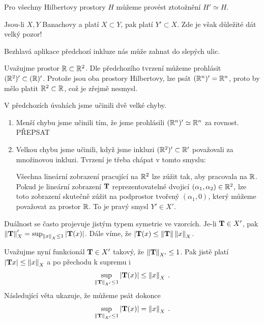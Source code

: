 \begin{corollary}
Pro všechny Hilbertovy prostory $H$ můžeme provést ztotožnění $H' \simeq H$.
\end{corollary}

Jsou-li $X,Y$ Banachovy a platí $X \subset Y$, pak platí $Y' \subset X$. Zde je však důležité dát velký pozor!

\begin{example}
Bezhlavá aplikace předchozí inkluze nás může zahnat do slepých ulic.

Uvažujme prostor $\mathbb{R} \subset \mathbb{R}^2$. Dle předchozího tvrzení můžeme prohlásit $(\mathbb{R}^2)' \subset (\mathbb{R})'$. Protože jsou oba prostory Hilbertovy, lze psát $(\mathbb{R}^n)' = \mathbb{R}^n $, proto by mělo platit $\mathbb{R}^2 \subset \mathbb{R}$, což je zřejmě nesmysl.

V předchozích úvahách jsme učinili dvě velké chyby. \begin{enumerate}
    \item Menší chybu jsme učinili tím, že jsme prohlásili $(\mathbb{R}^n)' \simeq \mathbb{R}^n$ za rovnost. PŘEPSAT
    \item Velkou chybu jsme učinili, když jsme inkluzi $(\mathbb{R}^2)' \subset \mathbb{R}'$ považovali za množinovou inkluzi. Tvrzení je třeba chápat v tomto smyslu:
    
    Všechna lineární zobrazení pracující na $\mathbb{R}^2$ lze zúžit tak, aby pracovala na $\mathbb{R}$. Pokud je lineární zobrazení $\mathbf{T}$ reprezentovatelné dvojicí $(\alpha_1, \alpha_2) \in \mathbb{R}^2$, lze toto zobrazení skutečně zúžit na podprostor tvořený $(\alpha_1, 0)$, který můžeme považovat za prostor $\mathbb{R}$. To je pravý smysl  $Y' \in X'$.
\end{enumerate}
\end{example}

Duálnost se často projevuje jistým typem symetrie ve vzorcích. Je-li $\mathbf{T} \in X'$, pak $\left\lVert\mathbf{T}\right\rVert_X' = \sup_{\left\lVert x\right\rVert_X \leq 1} |\mathbf{T}(x)|$. Dále víme, že $|\mathbf{T}(x) \leq \left\lVert\mathbf{T}\right\rVert \left\lVert x\right\rVert_X$. 

Uvažujme nyní funkcionál $\mathbf{T} \in X'$ takový, že $\left\lVert\mathbf{T}\right\rVert_{X'} \leq 1$. Pak jistě platí $|\mathbf{T} x| \leq \left\lVert x\right\rVert_X$ a po přechodu k supremu i \begin{align*}
    \sup_{\left\lVert\mathbf{T}\right\rVert_{X'} \leq 1} |\mathbf{T}(x)| \leq \left\lVert x\right\rVert_X \:.
\end{align*}
Následující věta ukazuje, že můžeme psát dokonce \begin{align*}
    \sup_{\left\lVert\mathbf{T}\right\rVert_{X'} \leq 1} |\mathbf{T}(x)| = \left\lVert x\right\rVert_X \:.
\end{align*}

